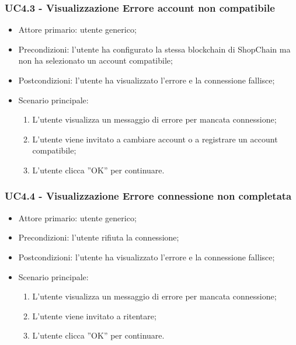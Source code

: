\subsubsection{UC4.3 - Visualizzazione Errore account non compatibile}

\begin{itemize}
    \item Attore primario: utente generico;
    \item Precondizioni: l'utente ha configurato la stessa blockchain\glo{} di ShopChain ma non ha selezionato un account compatibile;
    \item Postcondizioni: l'utente ha visualizzato l'errore e la connessione fallisce;
    \item Scenario principale:
          \begin{enumerate}
              \item L'utente visualizza un messaggio di errore per mancata connessione;
              \item L'utente viene invitato a cambiare account o a registrare un account compatibile;
              \item L'utente clicca ”OK” per continuare.
          \end{enumerate}
\end{itemize}

\subsubsection{UC4.4 - Visualizzazione Errore connessione non completata}

\begin{itemize}
    \item Attore primario: utente generico;
    \item Precondizioni: l'utente rifiuta la connessione;
    \item Postcondizioni: l'utente ha visualizzato l'errore e la connessione fallisce;
    \item Scenario principale:
          \begin{enumerate}
              \item L'utente visualizza un messaggio di errore per mancata connessione;
              \item L'utente viene invitato a ritentare;
              \item L'utente clicca ”OK” per continuare.
          \end{enumerate}
\end{itemize}

